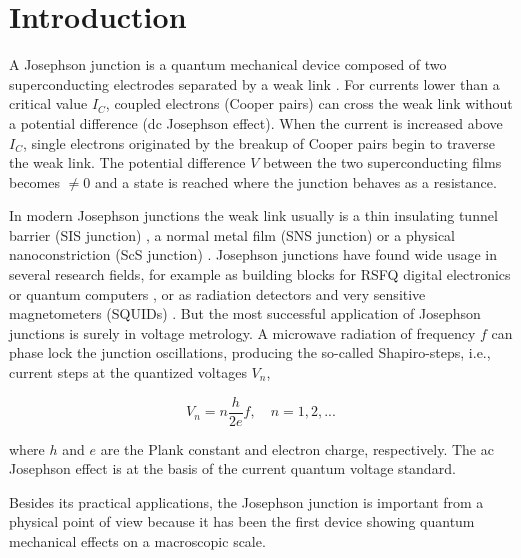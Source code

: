 \section{Introduction}


A Josephson junction is a quantum mechanical device composed of two superconducting electrodes separated by a weak link \cite{Barone:1982}.
For currents lower than a critical value $I_C$, coupled electrons (Cooper pairs) can cross the weak link without a potential difference (dc Josephson effect).
When the current is increased above $I_C$, single electrons originated by the breakup of Cooper pairs begin to traverse the weak link. The potential difference $V$ between the two superconducting films becomes $\neq 0$ and a state is reached where the junction behaves as a resistance.

In modern Josephson junctions the weak link usually is a thin insulating tunnel barrier (SIS junction) \cite{Gurvitch:1983}, a normal metal film (SNS junction) \cite{Benz:1995} or a physical nanoconstriction (ScS junction) \cite{Cybart:2015, DeLeo:2016}. Josephson junctions have found wide usage in several research fields, for example as building blocks for RSFQ digital electronics  or quantum computers \cite{Likharev:1991}, or as radiation detectors and very sensitive magnetometers (SQUIDs) \cite{Maggi:2006b, Troeman:2007, Granata:2015}.
But the most successful application of Josephson junctions is surely in voltage metrology.
A microwave radiation of frequency $f$ can phase lock the junction oscillations, producing the so-called Shapiro-steps, i.e., current steps at the quantized voltages $V_n$, 

\begin{equation}
	V_n = n \frac{h}{2 e} f, \quad n = 1, 2, ...
\label{eq:voltage_steps}
\end{equation}

where $h$ and $e$ are the Plank constant and electron charge, respectively. The ac Josephson effect is at the basis of the current quantum voltage standard.

Besides its practical applications, the Josephson junction is important from a physical point of view because it has been the first device showing quantum mechanical effects on a macroscopic scale.


